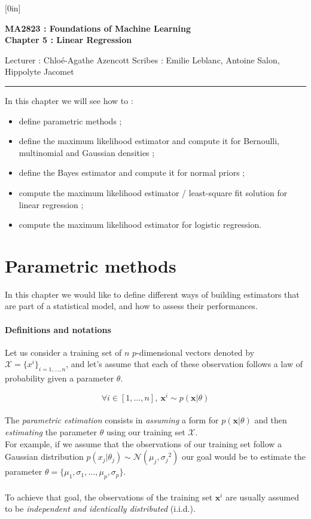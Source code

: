 \documentclass[a4paper,12pt]{article}
\newcommand{\xx}{{\bm x}}
\begin{document}
\raisebox{0.6in}[0in]{}
\vspace{-0.7in}

\begin{center}
\bf\large MA2823 : Foundations of Machine Learning \\
Chapter 5 : Linear Regression
\end{center}

\noindent
Lecturer : Chlo\'e-Agathe Azencott
\hfill
Scribes : Emilie Leblanc, Antoine Salon, Hippolyte Jacomet

\noindent
\rule{\textwidth}{1pt}

\medskip

In this chapter we will see how to :
\begin{itemize}
\item define parametric methods ;
\item define the maximum likelihood estimator and compute it
for Bernoulli, multinomial and Gaussian densities ;
\item define the Bayes estimator and compute it for normal
priors ;
\item compute the maximum likelihood estimator / least-square
fit solution for linear regression ;
\item compute the maximum likelihood estimator for logistic
regression.
\end{itemize}

\section{Parametric methods}

In this chapter we would like to define different ways of building estimators that are part of a statistical model, and how to assess their performances.

\paragraph{Definitions and notations} Let us consider a training set of $n$ $p$-dimensional vectors denoted by $\mathcal{X}=\{x^i\}_{i=1,\dots,n}$, and let's assume that each of these observation follows a law of probability given a parameter $\theta$.

\[
\forall i \in [1,\dots,n],\ \xx^{i}\sim{}p(\xx|\theta)
\]\\
The {\em parametric estimation} consists in {\em assuming} a form for $p(\xx|\theta)$ and then {\em estimating} the parameter $\theta$ using our training set $\mathcal{X}$. \\
For example, if we assume that the observations of our training set follow a Gaussian distribution $p(x_{j}|\theta_j)\sim{}\mathcal{N}(\mu_j,{\sigma_j}^2)$ our goal would be to estimate the parameter $\theta=\{\mu_1,\sigma_1,\dots,\mu_p,\sigma_p\}$. \\
\\
To achieve that goal, the observations of the training set $\xx^i$ are usually assumed to be {\em independent and identically distributed} (i.i.d.). \\
\end{document}
